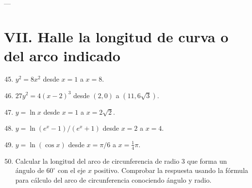 \documentclass[12pt]{article}
\begin{document}
---

\section*{VII. Halle la longitud de curva o del arco indicado}

\begin{enumerate}
\setcounter{enumi}{44}
\item $y^2=8x^2$ desde $x=1$ a $x=8$.
\item $27y^2=4(x-2)^3$ desde $(2,0)$ a $(11,6\sqrt{3})$.
\item $y=\ln x$ desde $x=1$ a $x=2\sqrt{2}$.
\item $y=\ln(e^x-1)/(e^x+1)$ desde $x=2$ a $x=4$.
\item $y=\ln(\cos x)$ desde $x=\pi/6$ a $x=\frac{1}{4} \pi$.
\item Calcular la longitud del arco de circunferencia de radio $3$ que forma un ángulo de $60^\circ$ con el eje $x$ positivo. Comprobar la respuesta usando la fórmula para cálculo del arco de circunferencia conociendo ángulo y radio.
\end{enumerate}
\end{document}
